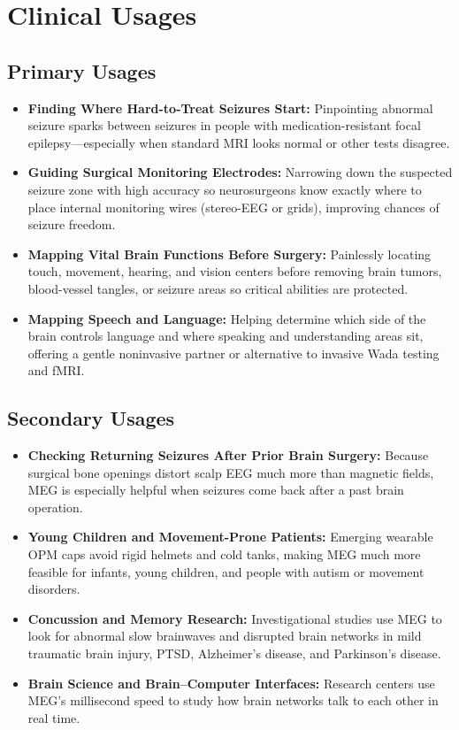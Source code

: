 \section{Clinical Usages}

\subsection{Primary Usages}
\begin{itemize}
  \item \textbf{Finding Where Hard-to-Treat Seizures Start:} Pinpointing abnormal seizure sparks between seizures in people with medication-resistant focal epilepsy---especially when standard MRI looks normal or other tests disagree.
  \item \textbf{Guiding Surgical Monitoring Electrodes:} Narrowing down the suspected seizure zone with high accuracy so neurosurgeons know exactly where to place internal monitoring wires (stereo-EEG or grids), improving chances of seizure freedom.
  \item \textbf{Mapping Vital Brain Functions Before Surgery:} Painlessly locating touch, movement, hearing, and vision centers before removing brain tumors, blood-vessel tangles, or seizure areas so critical abilities are protected.
  \item \textbf{Mapping Speech and Language:} Helping determine which side of the brain controls language and where speaking and understanding areas sit, offering a gentle noninvasive partner or alternative to invasive Wada testing and fMRI.
\end{itemize}

\subsection{Secondary Usages}
\begin{itemize}
  \item \textbf{Checking Returning Seizures After Prior Brain Surgery:} Because surgical bone openings distort scalp EEG much more than magnetic fields, MEG is especially helpful when seizures come back after a past brain operation.
  \item \textbf{Young Children and Movement-Prone Patients:} Emerging wearable OPM caps avoid rigid helmets and cold tanks, making MEG much more feasible for infants, young children, and people with autism or movement disorders.
  \item \textbf{Concussion and Memory Research:} Investigational studies use MEG to look for abnormal slow brainwaves and disrupted brain networks in mild traumatic brain injury, PTSD, Alzheimer's disease, and Parkinson's disease.
  \item \textbf{Brain Science and Brain--Computer Interfaces:} Research centers use MEG's millisecond speed to study how brain networks talk to each other in real time.
\end{itemize}

